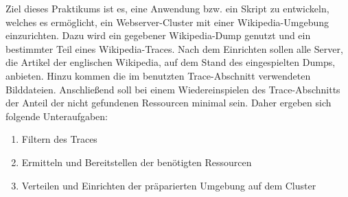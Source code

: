 Ziel dieses Praktikums ist es, eine Anwendung bzw. ein Skript zu entwickeln, welches es ermöglicht, ein Webserver-Cluster mit einer Wikipedia-Umgebung einzurichten. Dazu wird ein gegebener Wikipedia-Dump genutzt und ein bestimmter Teil eines Wikipedia-Traces. Nach dem Einrichten sollen alle Server, die Artikel der englischen Wikipedia, auf dem Stand des eingespielten Dumps, anbieten. Hinzu kommen die im benutzten Trace-Abschnitt verwendeten Bilddateien. Anschließend soll bei einem Wiedereinspielen des Trace-Abschnitts der Anteil der nicht gefundenen Ressourcen minimal sein. Daher ergeben sich folgende Unteraufgaben:
\begin{enumerate}
\item Filtern des Traces
\item Ermitteln und Bereitstellen der benötigten Ressourcen
\item Verteilen und Einrichten der präparierten Umgebung auf dem Cluster
\end{enumerate}

